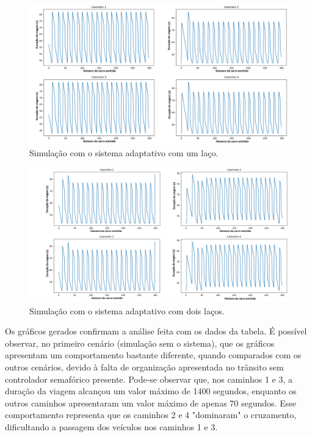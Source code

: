 \begin{figure}[H]
    \begin{center}
    \includegraphics[width=1\textwidth]{figuras/Trip_Duration_With_One_Loop.PNG}
    \end{center}
    \caption[Duração da viagem, cenário 3]{Simulação com o sistema adaptativo com um laço.}
    \label{tripOneLoop}
\end{figure}

\begin{figure}[H]
    \begin{center}
    \includegraphics[width=1\textwidth]{figuras/Trip_Duration_With_Two_Loop.PNG}
    \end{center}
    \caption[Duração da viagem, cenário 4]{Simulação com o sistema adaptativo com dois laços.}
    \label{tripTwoLoop}
\end{figure}

Os gráficos gerados confirmam a análise feita com os dados da tabela. É possível observar, no primeiro cenário (simulação sem o sistema), que os gráficos apresentam um comportamento bastante diferente, quando comparados com os outros cenários, devido à falta de organização apresentada no trânsito sem controlador semafórico presente. Pode-se observar que, nos caminhos 1 e 3, a duração da viagem alcançou um valor máximo de 1400 segundos, enquanto os outros caminhos apresentaram um valor máximo de apenas 70 segundos. Esse comportamento representa que os caminhos 2 e 4 "dominaram" o cruzamento, dificultando a passagem dos veículos nos caminhos 1 e 3.

